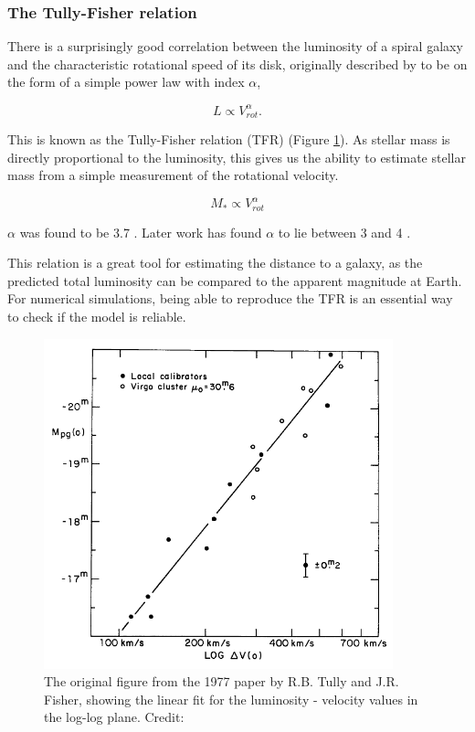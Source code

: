 \subsubsection{The Tully-Fisher relation}

There is a surprisingly good correlation between the luminosity of a spiral galaxy and the characteristic rotational speed of its disk, originally described by \textcite{TullyFisher1977} to be on the form of a simple power law with index $\alpha$,

\begin{equation}
    L \propto V_{rot}^\alpha.
\end{equation}

This is known as the Tully-Fisher relation (TFR) (Figure \ref{tully_fisher}). As stellar mass is directly proportional to the luminosity, this gives us the ability to estimate stellar mass from a simple measurement of the rotational velocity.

\begin{equation}
    M_* \propto V_{rot}^\alpha 
\end{equation}

$\alpha$ was found to be 3.7 \parencite{TullyFisher1977}. Later work has found $\alpha$ to lie between 3 and 4 \parencite{Lelli2019, Bloom2017}.

This relation is a great tool for estimating the distance to a galaxy, as the predicted total luminosity can be compared to the apparent magnitude at Earth. For numerical simulations, being able to reproduce the TFR is an essential way to check if the model is reliable.

\begin{figure}
    \centering
    \includegraphics[width=0.9\textwidth]{images/tully_fisher.png}
    \caption{The original figure from the 1977 paper by R.B. Tully and J.R. Fisher, showing the linear fit for the luminosity - velocity values in the log-log plane. Credit: \textcite{TullyFisher1977}}
    \label{tully_fisher}
\end{figure}

